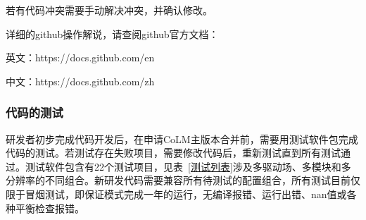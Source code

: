 若有代码冲突需要手动解决冲突，并确认修改。

详细的github操作解说，请查阅github官方文档：

英文：https://docs.github.com/en

中文：https://docs.github.com/zh


\subsubsection{代码的测试}

研发者初步完成代码开发后，在申请CoLM主版本合并前，需要用测试软件包完成代码的测试。若测试存在失败项目，需要修改代码后，重新测试直到所有测试通过。测试软件包含有22个测试项目，见表~\ref{测试列表}涉及多驱动场、多模块和多分辨率的不同组合。新研发代码需要兼容所有待测试的配置组合，所有测试目前仅限于冒烟测试，即保证模式完成一年的运行，无编译报错、运行出错、nan值或各种平衡检查报错。

